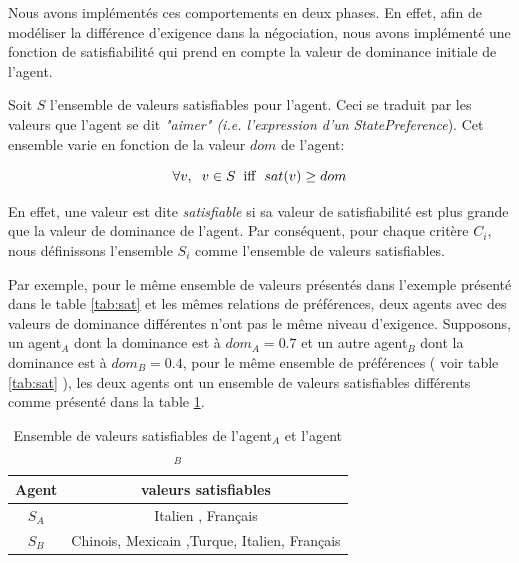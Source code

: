 	Nous avons implémentés ces comportements en deux phases. En effet, afin de modéliser la différence d'exigence dans la négociation, nous avons implémenté une fonction de satisfiabilité qui prend en compte la valeur de dominance initiale de l'agent. 
	
	Soit $S$ l'ensemble de valeurs satisfiables pour l'agent. Ceci se traduit par les valeurs que l'agent se dit \textit{"aimer" (i.e. l'expression d'un } \emph{StatePreference}). Cet ensemble varie en fonction de la valeur $dom$ de l'agent:
	
	\begin{equation}
	\forall v,\hspace{2mm} v\in S\hspace{2mm}\mathrm{iff}\hspace{2mm}sat(v) \geq dom
	\end{equation}
	
	En effet, une valeur est dite \textit{satisfiable} si sa valeur de satisfiabilité est plus grande que la valeur de dominance de l'agent.
	Par conséquent, pour chaque critère $C_i$, nous définissons l'ensemble $S_i$ comme l'ensemble de valeurs satisfiables. 
		
	Par exemple, pour le même ensemble de valeurs présentés dans l'exemple présenté dans le table \ref{tab:sat} et les mêmes relations de préférences, deux agents avec des valeurs de dominance différentes n'ont pas le même niveau d'exigence. Supposons, un agent$_A$ dont la dominance est à $dom_A=0.7$ et un autre agent$_B$ dont la dominance est à $dom_B=0.4$, pour le même ensemble de préférences ( voir table \ref{tab:sat} ), les deux agents ont un ensemble de valeurs satisfiables différents comme présenté dans la table \ref{tab:exSat}.
	
	\begin{table}[h]
		\centering
		{\scriptsize
			\begin{tabular}{ |c|c| }
				\hline
				\textbf{Agent} & \textbf{valeurs satisfiables} \\
				\hline				
				$S_A$ & Italien , Français \\
				\hline
				
				$S_B$ & Chinois,  Mexicain ,Turque, Italien, Français\\
				\hline
				
			\end{tabular}}
			\caption{Ensemble de valeurs satisfiables de l'agent$_A$ et l'agent $_B$}
			\label{tab:exSat}
		\end{table}


